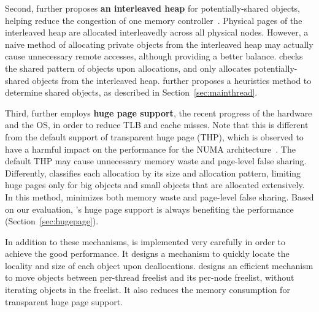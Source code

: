   
Second, \NM{} further proposes \textbf{an interleaved heap} for potentially-shared objects, helping reduce the congestion of one memory controller~\cite{Blagodurov:2011:CNC:2002181.2002182}. Physical pages of the interleaved heap are allocated interleavedly across all physical nodes. However, a naive method of allocating private objects from the interleaved heap may actually cause unnecessary remote accesses, although providing a better balance. 
\NM{} checks the shared pattern of objects upon allocations, and only allocates potentially-shared objects from the interleaved heap. \NM{} further proposes a heuristics method to determine shared objects, as described in Section~\ref{sec:mainthread}. 

 Third, \NM{} further employs \textbf{huge page support}, the recent progress of the hardware and the OS, in order to reduce TLB and cache misses. Note that this is different from the default support of transparent huge page (THP), which is observed to have a harmful impact on the performance for the NUMA architecture~\cite{Gaud:2014:LPM:2643634.2643659, DBLP:conf/asplos/PanwarBG19}. The default THP may cause unnecessary memory waste and page-level false sharing. Differently, \NM{} classifies each allocation by its size and allocation pattern, limiting huge pages only for big objects and small objects that are allocated extensively. In this method, \NM{} minimizes both memory waste and page-level false sharing. Based on our evaluation, \NM{}'s huge page support is always benefiting the performance (Section~\ref{sec:hugepage}). 
 
 In addition to these mechanisms, \NM{} is implemented very carefully in order to achieve the good performance. It designs a mechanism to quickly locate the locality and size of each object upon deallocations. \NM{} designs an efficient mechanism to move objects between per-thread freelist and its per-node freelist, without iterating objects in the freelist. It also reduces the memory consumption for transparent huge page support. 
 
